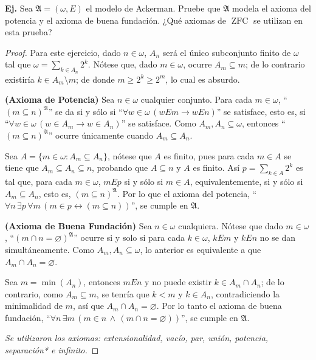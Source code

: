 \documentclass[letterpaper,DIV=15,12pt]{scrartcl}
\newcounter{Ejer}
\newcommand{\pts}{}
\newenvironment{ejercicio}[1]{\noindent
        \ifthenelse{\equal{#1}{1}}{\renewcommand{\pts}{\textbf{(#1 pt)}}}{\renewcommand{\pts}{\textbf{(#1 pts)}}}\textbf{Ej. \theEjer} \pts\stepcounter{Ejer}}{}
\renewcommand{\emptyset}{\varnothing}
\newcommand{\tq}{:}
\begin{document}
    \begin{ejercicio}{5}
        Sea $\mathfrak{A}=(\omega,E)$ el modelo de Ackerman. Pruebe que $\mathfrak{A}$ modela el axioma del potencia y el axioma de buena fundación. ¿Qué axiomas de $\operatorname*{ZFC}$ se utilizan en esta prueba?
    \end{ejercicio}
    \begin{proof} Para este ejercicio, dado $n \in \omega$, $A_n$ será el único subconjunto finito de $\omega$ tal que $\omega = \sum_{k \in A_n} 2^k$. Nótese que, dado $m \in \omega$, ocurre $A_m \subseteq m$; de lo contrario existiría $k \in A_m \setminus m$; de donde $m \geq 2^k \geq 2^m$, lo cual es absurdo.
        
        \textbf{(Axioma de Potencia)} Sea $n \in \omega$ cualquier conjunto. Para cada $m \in \omega$, ``$(m \subseteq n)^\mathfrak{A}$'' se da si y sólo si ``$\forall w \in \omega \, (w E m \to w E n)$'' se satisface, esto es, si ``$\forall w \in \omega \, (w \in A_m \to w \in A_n)$'' se satisface. Como $A_m, A_n \subseteq \omega$, entonces ``$(m \subseteq n)^\mathfrak{A}$'' ocurre únicamente cuando $A_m \subseteq A_n$.

        Sea $A=\{ m \in \omega \tq A_m \subseteq A_n \}$, nótese que $A$ es finito, pues para cada $m \in A$ se tiene que $A_m \subseteq A_n \subseteq n$, probando que $A \subseteq n$ y $A$ es finito. Así $p= \sum_{k \in A} 2^k$ es tal que, para cada $m \in \omega$, $m E p$ si y sólo si $m \in A$, equivalentemente, si y sólo si $A_m \subseteq A_n$, esto es, $(m \subseteq n)^\mathfrak{A}$. Por lo que el axioma del potencia, ``$\forall n \, \exists p \, \forall m \, (m \in p \leftrightarrow (m \subseteq n))$'', se cumple en $\mathfrak{A}$.

        \textbf{(Axioma de Buena Fundación)} Sea $n \in \omega$ cualquiera. Nótese que dado $m \in \omega$, ``$(m \cap n = \emptyset)^\mathfrak{A}$'' ocurre si y solo si para cada $k \in \omega$, $k E m$ y $k E n$ no se dan simultáneamente. Como $A_m,A_n \subseteq \omega$, lo anterior es equivalente a que $A_m \cap A_n = \emptyset$.
        
        Sea $m=\min(A_n)$, entonces $m E n$ y no puede existir $k \in A_m \cap A_n$; de lo contrario, como $A_m \subseteq m$, se tenría que $k < m$ y $k \in A_n$, contradiciendo la minimalidad de $m$, así que $A_m \cap A_n = \emptyset$. Por lo tanto el axioma de buena fundación, ``$\forall n \, \exists m \, (m \in n \, \land \, (m \cap n = \emptyset))$'', se cumple en $\mathfrak{A}$.

        \textit{Se utilizaron los axiomas: extensionalidad, vacío, par, unión, potencia, separación* e infinito.}
    \end{proof}
\end{document}
